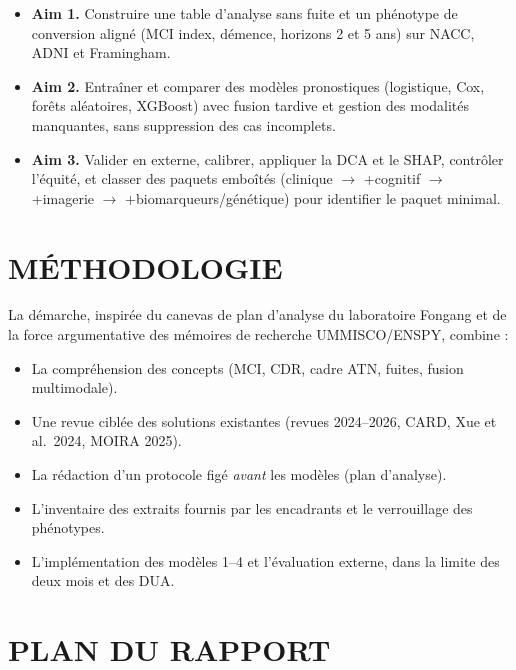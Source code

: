 \begin{itemize}[label=, font=\large \color{darkorange}]
\item \textbf{Aim 1.} Construire une table d'analyse sans fuite et un phénotype de conversion aligné (MCI index, démence, horizons 2 et 5 ans) sur NACC, ADNI et Framingham.
\item \textbf{Aim 2.} Entraîner et comparer des modèles pronostiques (logistique, Cox, forêts aléatoires, XGBoost) avec fusion tardive et gestion des modalités manquantes, sans suppression des cas incomplets.
\item \textbf{Aim 3.} Valider en externe, calibrer, appliquer la \ac{DCA} et le \ac{SHAP}, contrôler l'équité, et classer des paquets emboîtés (clinique $\rightarrow$ +cognitif $\rightarrow$ +imagerie $\rightarrow$ +biomarqueurs/génétique) pour identifier le paquet minimal.
\end{itemize}

\section*{MÉTHODOLOGIE}
La démarche, inspirée du canevas de plan d'analyse du laboratoire Fongang et de la force argumentative des mémoires de recherche UMMISCO/ENSPY, combine :

\begin{itemize}[label=, font=\large \color{darkorange}]
\item La compréhension des concepts (MCI, \ac{CDR}, cadre \ac{ATN}, fuites, fusion multimodale).
\item Une revue ciblée des solutions existantes (revues 2024--2026, CARD, Xue et al.\ 2024, MOIRA 2025).
\item La rédaction d'un protocole figé \emph{avant} les modèles (plan d'analyse).
\item L'inventaire des extraits fournis par les encadrants et le verrouillage des phénotypes.
\item L'implémentation des modèles 1--4 et l'évaluation externe, dans la limite des deux mois et des DUA.
\end{itemize}

\section*{PLAN DU RAPPORT}

